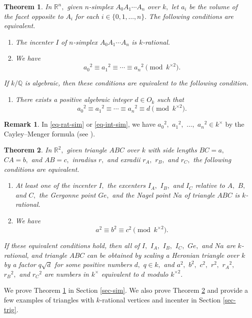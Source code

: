 \documentclass{article}
\theoremstyle{definition}
\newtheorem{rmk}{Remark}
\theoremstyle{plain}
\newtheorem{thm}{Theorem}
\begin{document}
\begin{thm}\label{thm-sim}
In $\mathbb R^n,$ given $n$-simplex $A_0A_1\cdots A_n$ over $k,$ let $a_i$ be the volume of the facet opposite to $A_i$ for each $i \in \{ 0,1,\dots,n\}.$ 
The following conditions are equivalent.
\begin{enumerate}
\item[{\rm (S1)}]
The incenter $I$ of $n$-simplex $A_0A_1\cdots A_n$ is $k$-rational.
\item[{\rm (S2)}]
We have 
\begin{equation} 
a_0{}^2 \equiv a_1{}^2 \equiv \cdots \equiv a_n{}^2 \pmod{k^{\times 2}}. \label{eq-rat-sim}
\end{equation} 
\end{enumerate}
If $k/\mathbb Q$ is algebraic, then these conditions are equivalent to the following condition.
\begin{enumerate}
\item[{\rm (S2)${}'$}]
There exists a positive algebraic integer $d \in O_k$ such that 
\begin{equation} 
a_0{}^2 \equiv a_1{}^2 \equiv \cdots \equiv a_n{}^2 \equiv d\pmod{k^{\times 2}}.\label{eq-int-sim}
\end{equation} 
\end{enumerate}
\end{thm}
\begin{rmk}
In \eqref{eq-rat-sim} or \eqref{eq-int-sim}, we have $a_0{}^2,$ $a_1{}^2,$ $\dots,$ $a_n{}^2 \in k^\times$ by the Cayley--Menger formula (see \cite[Section 5, Chapter VIII]{Som58}).
\end{rmk}
\begin{thm}\label{thm-trig}
In $\mathbb R^2,$ given triangle $ABC$ over $k$ with side lengths $BC = a,$ $CA = b,$ and $AB = c,$ inradius $r,$ and exradii $r_A,$ $r_B,$ and $r_C,$ the following conditions are equivalent.
\begin{enumerate}
\item[{\rm (T1)}]
At least one of the incenter $I,$ the excenters $I_A,$ $I_B,$ and $I_C$ relative to $A,$ $B,$ and $C,$ the Gergonne point $Ge,$ and the Nagel point $Na$ of triangle $ABC$ is $k$-rational.
\item[{\rm (T2)}]
We have 
\begin{equation} 
a^2 \equiv b^2 \equiv c^2 \pmod{k^{\times 2}}. \label{eq-trig} 
\end{equation} 
\end{enumerate}
If these equivalent conditions hold, then all of $I,$ $I_A,$ $I_B,$ $I_C,$ $Ge,$ and $Na$ are $k$-rational, and triangle $ABC$ can be obtained by scaling a Heronian triangle over $k$ by a factor $q\sqrt d$ for some positive numbers $d,$ $q \in k,$ and $a^2,$ $b^2,$ $c^2,$ $r^2,$ $r_A{}^2,$ $r_B{}^2,$ and $r_C{}^2$ are numbers in $k^\times$ equivalent to $d$ modulo $k^{\times 2}.$
\end{thm}
We prove Theorem \ref{thm-sim} in Section \ref{sec-sim}.  
We also prove Theorem \ref{thm-trig} and provide a few examples of triangles with $k$-rational vertices and incenter in Section \ref{sec-trig}.
\end{document}
